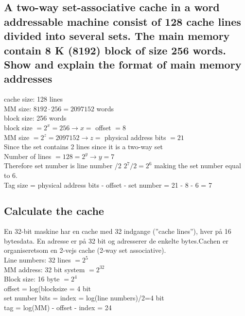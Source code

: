 \documentclass[12pt, a4paper]{article}
\begin{document}
		\subsection{A two-way set-associative cache in a word addressable machine consist of 128 cache lines divided into several sets. The main memory contain 8 K (8192) block of size 256 words. Show and explain the format of main memory addresses}
			cache size: 128 lines\\
			MM size: $8192\cdot 256=2097152$ words\\
			block size: 256 words\\
			block size $ = 2^x=256 \rightarrow x =$ offset $=8$\\
			MM size $=2^z=2097152 \rightarrow z=$ physical address bits $=21$\\
			Since the set contains 2 lines since it is a two-way set\\
			Number of lines $ = 128=2^y \rightarrow y=7$\\
			Therefore set number is line number /2 $2^7/2=2^6$ making the set number equal to 6.\\
			Tag size = physical address bits - offset - set number = 21 - 8 - 6 = 7 
		\subsection{Calculate the cache}
			En 32-bit maskine har en cache med 32 indgange (”cache lines”), hver på 16 bytesdata. En adresse er på 32 bit og adresserer de enkelte bytes.Cachen er organiseretsom en 2-vejs cache (2-way set associative).\\
			Line numbers: 32 lines $=2^5$\\
			MM address: 32 bit system $=2^32$\\
			Block size: 16 byte  $=2^4$\\
			offset = log(blocksize = 4 bit \\
			set number bits = index = log(line  numbers)/2=4 bit\\
			tag  = log(MM) - offset - index = 24
\end{document}
